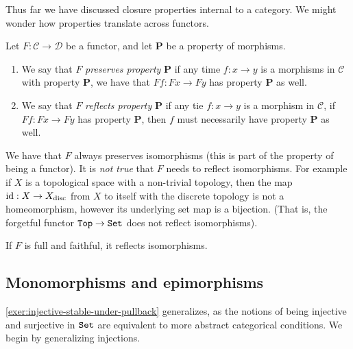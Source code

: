Thus far we have discussed closure properties internal to a category. We might wonder how properties translate across functors.

\begin{definition}\label{def:functor-preserve-reflect-properties} Let $F: \mathscr{C} \to \mathscr{D}$ be a functor, and let \textbf{P} be a property of morphisms.
\begin{enumerate}
    \item We say that $F$ \textit{preserves property} \textbf{P} if any time $f: x \to y$ is a morphisms in $\mathscr{C}$ with property \textbf{P}, we have that $Ff: Fx \to Fy$ has property \textbf{P} as well.

    \item We say that $F$ \textit{reflects property} \textbf{P} if any tie $f:x \to y$ is a morphism in $\mathscr{C}$, if $Ff: Fx \to Fy$ has property \textbf{P}, then $f$ must necessarily have property \textbf{P} as well.
\end{enumerate}
\end{definition}

\begin{remark} We have that $F$ always preserves isomorphisms (this is part of the property of being a functor). It is \textit{not true} that $F$ needs to reflect isomorphisms. For example if $X$ is a topological space with a non-trivial topology, then the map $\text{id} : X \to X_{\text{disc}}$ from $X$ to itself with the discrete topology is not a homeomorphism, however its underlying set map is a bijection. (That is, the forgetful functor $\texttt{Top} \to \texttt{Set}$ does not reflect isomorphisms).
\end{remark}

\begin{exercise} If $F$ is full and faithful, it reflects isomorphisms.
\end{exercise}




\subsection{Monomorphisms and epimorphisms}

\autoref{exer:injective-stable-under-pullback} generalizes, as the notions of being injective and surjective in $\texttt{Set}$ are equivalent to more abstract categorical conditions. We begin by generalizing injections.

